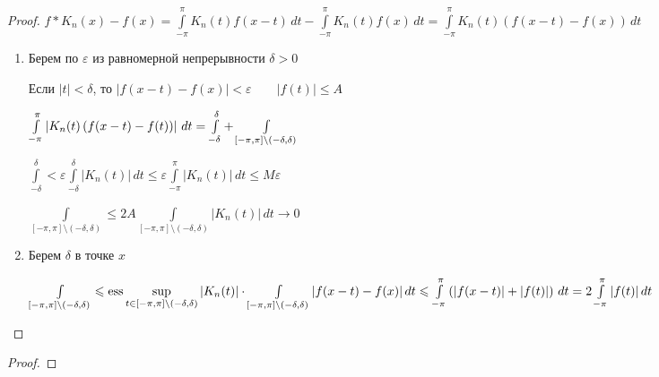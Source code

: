 \begin{proof}\thmslashn
	
	$f*K_n(x) - f(x) = \int\limits_{-\pi}^\pi K_n(t) f(x - t)\,dt - \int\limits_{-\pi}^\pi K_n(t) f(x)\,dt = \int\limits_{-\pi}^\pi K_n(t) (f(x - t) - f(x))\,dt $

	\begin{enumerate}
		\item 
		Берем по $\varepsilon$ из равномерной непрерывности $\delta > 0$
		
		Если $|t| < \delta$, то $|f(x - t) - f(x)| < \varepsilon\qquad |f(t)| \leqslant A$
		
		$\int\limits_{-\pi}^\pi \left|K_n(t)\left(f(x - t) - f(t)\right)\right|\,dt = \int\limits_{-\delta}^\delta + \int\limits_{[-\pi, \pi]\setminus (-\delta, \delta)}$
		
		$\int\limits_{-\delta}^\delta < \varepsilon \int\limits_{-\delta}^\delta |K_n(t)|\,dt \leqslant \varepsilon \int\limits_{-\pi}^\pi |K_n(t)|\,dt \leqslant M\varepsilon$
		
		$\int\limits_{[-\pi, \pi]\setminus (-\delta, \delta)} \leqslant 2A \int\limits_{[-\pi, \pi]\setminus (-\delta, \delta)} |K_n(t)|\,dt \to 0$
		
		\item
		Берем $\delta$ в точке $x$
		
		$\int\limits_{[-\pi, \pi]\setminus (-\delta, \delta)} \leqslant \operatorname{ess}\sup\limits_{t\in [-\pi, \pi]\setminus (-\delta, \delta)}|K_n(t)|\cdot \int\limits_{[-\pi, \pi]\setminus (-\delta, \delta)} |f(x - t) - f(x)|\,dt \leqslant \int\limits_{-\pi}^\pi \left(|f(x - t)| + |f(t)|\right)\,dt = 2\int\limits_{-\pi}^\pi |f(t)|\,dt$
	
	\end{enumerate}
	
	
\end{proof}



\begin{definition}\thmslashn
\end{definition}

\begin{lemma}\thmslashn
\end{lemma}

\begin{theorem}\thmslashn
\end{theorem}

\begin{proof}\thmslashn
\end{proof}

\begin{consequence}\thmslashn
\end{consequence}
